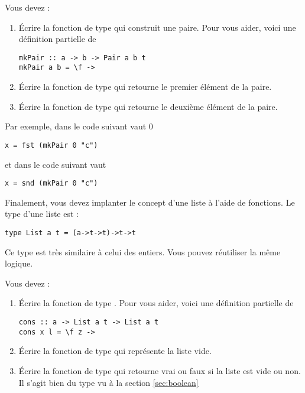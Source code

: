 \begin{Exercise}
Vous devez :
\begin{enumerate}
\item Écrire la fonction  de type
   qui construit une
  paire. Pour vous aider, voici une définition partielle de
\begin{verbatim}
mkPair :: a -> b -> Pair a b t
mkPair a b = \f -> 
\end{verbatim}

\item Écrire la fonction  de type  qui retourne le premier élément de la paire.

\item Écrire la fonction  de type  qui retourne le deuxième élément de la paire.
\end{enumerate}

Par exemple, dans le code suivant  vaut 0
\begin{verbatim}
x = fst (mkPair 0 "c")
\end{verbatim}
et dans le code suivant  vaut 
\begin{verbatim}
x = snd (mkPair 0 "c")
\end{verbatim}

\ExePart[title={Liste}]
\label{sec:paires}
Finalement, vous devez implanter le concept d'une liste à l'aide de fonctions. Le
type d'une liste est :
\begin{verbatim}
type List a t = (a->t->t)->t->t
\end{verbatim}
Ce type est très similaire à celui des entiers. Vous pouvez réutiliser
la même logique.

Vous devez :
\begin{enumerate}
\item Écrire la fonction  de type . Pour vous aider, voici une définition
  partielle de 
\begin{verbatim}
cons :: a -> List a t -> List a t
cons x l = \f z ->
\end{verbatim}

\item Écrire la fonction  de type  qui représente la liste vide.

\item Écrire la fonction  de type  qui retourne vrai ou faux si la liste
  est vide ou non. Il s'agit bien du type  vu à la
  section \ref{sec:boolean}


\end{enumerate}
\end{Exercise}
